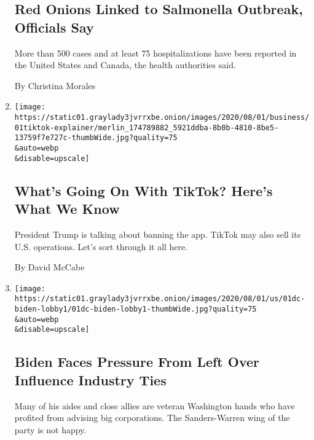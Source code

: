 \begin{enumerate}
  \hypertarget{red-onions-linked-to-salmonella-outbreak-officials-say}{%
  \subsection{Red Onions Linked to Salmonella Outbreak, Officials
  Say}\label{red-onions-linked-to-salmonella-outbreak-officials-say}}

  More than 500 cases and at least 75 hospitalizations have been
  reported in the United States and Canada, the health authorities said.

  By Christina Morales
\item
  \href{/2020/08/01/technology/tiktok-trump-microsoft-bytedance-china-ban.html}{}

  \texttt{[image: https://static01.graylady3jvrrxbe.onion/images/2020/08/01/business/01tiktok-explainer/merlin\_174789882\_5921ddba-8b0b-4810-8be5-13759f7e727c-thumbWide.jpg?quality=75\\\&auto=webp\\\&disable=upscale]}

  \hypertarget{whats-going-on-with-tiktok-heres-what-we-know}{%
  \subsection{What's Going On With TikTok? Here's What We
  Know}\label{whats-going-on-with-tiktok-heres-what-we-know}}

  President Trump is talking about banning the app. TikTok may also sell
  its U.S. operations. Let's sort through it all here.

  By David McCabe
\item
  \href{/2020/08/01/us/politics/biden-lobbyist-ties.html}{}

  \texttt{[image: https://static01.graylady3jvrrxbe.onion/images/2020/08/01/us/01dc-biden-lobby1/01dc-biden-lobby1-thumbWide.jpg?quality=75\\\&auto=webp\\\&disable=upscale]}

  \hypertarget{biden-faces-pressure-from-left-over-influence-industry-ties}{%
  \subsection{Biden Faces Pressure From Left Over Influence Industry
  Ties}\label{biden-faces-pressure-from-left-over-influence-industry-ties}}

  Many of his aides and close allies are veteran Washington hands who
  have profited from advising big corporations. The Sanders-Warren wing
  of the party is not happy.


\end{enumerate}
